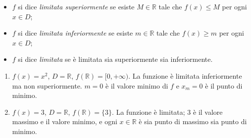 \documentclass[11pt,a4paper]{article}
\begin{document}
\begin{definizione}
\begin{itemize}
    \item $f$ si dice \emph{limitata superiormente} se esiste $M \in \mathbb{R}$ tale che $f(x) \leq M$ per ogni $x \in D$;
    \item $f$ si dice \emph{limitata inferiormente} se esiste $m \in \mathbb{R}$ tale che $f(x) \geq m$ per ogni $x \in D$;
    \item $f$ si dice \emph{limitata} se è limitata sia superiormente sia inferiormente.
\end{itemize}
\end{definizione}

\begin{esempio}
\leavevmode
\begin{enumerate}
    \item $f(x) = x^2$, $D = \mathbb{R}$, $f(\mathbb{R}) = [0, +\infty)$. La funzione è limitata inferiormente ma non superiormente. $m = 0$ è il valore minimo di $f$ e $x_m = 0$ è il punto di minimo.
    \item $f(x) = 3$, $D = \mathbb{R}$, $f(\mathbb{R}) = \{3\}$. La funzione è limitata; $3$ è il valore massimo e il valore minimo, e ogni $x \in \mathbb{R}$ è sia punto di massimo sia punto di minimo.
\end{enumerate}
\end{esempio}
\end{document}
